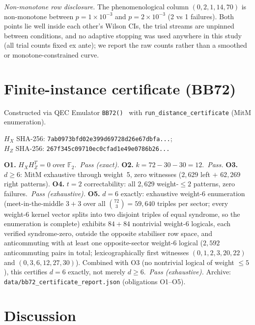 \documentclass[11pt,a4paper]{article}
\begin{document}
\emph{Non-monotone row disclosure.} The phenomenological column
$(0,2,1,14,70)$ is non-monotone between $p=1\times10^{-3}$ and
$p=2\times10^{-3}$ (2 vs 1 failures). Both points lie well inside each
other's Wilson CIs, the trial streams are unpinned between conditions,
and no adaptive stopping was used anywhere in this study (all trial
counts fixed ex ante); we report the raw counts rather than a smoothed
or monotone-constrained curve.

\section{Finite-instance certificate (BB72)}
\label{sec:cert}

Constructed via QEC Emulator \texttt{BB72()}~\cite{AlDaajeh2026emulator}
with \texttt{run\_distance\_certificate} (MitM enumeration).

$H_X$ SHA-256: \texttt{7ab0973bfd02e399d69728d26e67dbfa...};\\
$H_Z$ SHA-256: \texttt{267f345c09710ec0cfad1e49e0786b26...}

\textbf{O1.} $H_XH_Z^T=0$ over $\mathbb{F}_2$.\ \textit{Pass (exact).}
\textbf{O2.} $k=72-30-30=12$.\ \textit{Pass.}
\textbf{O3.} $d\ge6$: MitM exhaustive through weight~5, zero witnesses
($2{,}629$ left $+$ $62{,}269$ right patterns).
\textbf{O4.} $t=2$ correctability: all $2{,}629$ weight-$\le2$ patterns,
zero failures.\ \textit{Pass (exhaustive).}
\textbf{O5.} $d=6$ exactly: exhaustive weight-6 enumeration
(meet-in-the-middle $3{+}3$ over all $\binom{72}{3}=59{,}640$ triples per
sector; every weight-6 kernel vector splits into two disjoint triples of
equal syndrome, so the enumeration is complete) exhibits $84+84$
nontrivial weight-6 logicals, each verified syndrome-zero, outside the
opposite stabiliser row space, and anticommuting with at least one
opposite-sector weight-6 logical ($2{,}592$ anticommuting pairs in total;
lexicographically first witnesses $(0,1,2,3,20,22)$ and $(0,3,6,12,27,30)$).
Combined with O3 (no nontrivial logical of weight $\le5$), this certifies
$d=6$ exactly, not merely $d\ge6$.\ \textit{Pass (exhaustive).}
Archive: \texttt{data/bb72\_certificate\_report.json} (obligations O1--O5).

\section{Discussion}
\end{document}
